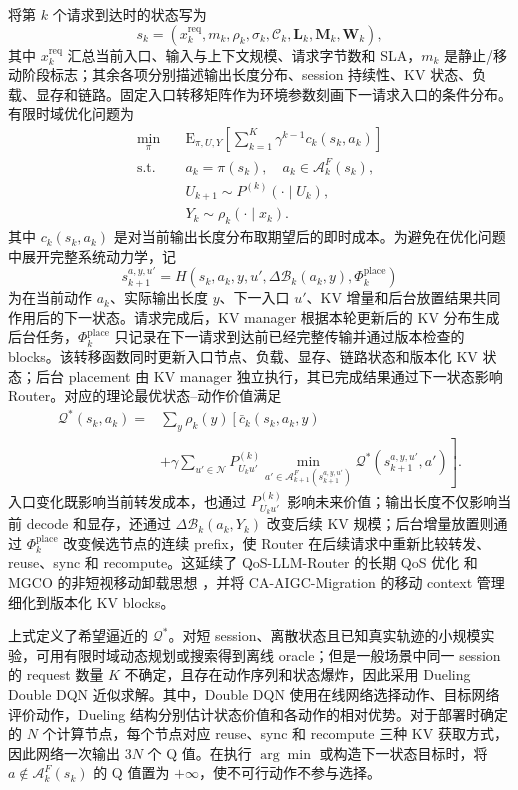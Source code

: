 将第 \(k\) 个请求到达时的状态写为
\[
s_k=
(x_k^{\mathrm{req}},m_k,\rho_k,\sigma_k,\mathcal C_k,
\mathbf L_k,\mathbf M_k,\mathbf W_k),
\]
其中 \(x_k^{\mathrm{req}}\) 汇总当前入口、输入与上下文规模、请求字节数和 SLA，\(m_k\) 是静止/移动阶段标志；其余各项分别描述输出长度分布、session 持续性、KV 状态、负载、显存和链路。固定入口转移矩阵作为环境参数刻画下一请求入口的条件分布。有限时域优化问题为
\[
\begin{array}{ll}
\displaystyle\min_{\pi}\quad&
\displaystyle
\mathrm E_{\pi,U,Y}
\left[\sum_{k=1}^{K}\gamma^{k-1}c_k(s_k,a_k)\right]\\
\mathrm{s.t.}\quad&
a_k=\pi(s_k),\quad a_k\in\mathcal A_k^F(s_k),\\
&U_{k+1}\sim P^{(k)}(\cdot\mid U_k),\\
&Y_k\sim\rho_k(\cdot\mid x_k).
\end{array}
\]
其中 \(c_k(s_k,a_k)\) 是对当前输出长度分布取期望后的即时成本。为避免在优化问题中展开完整系统动力学，记
\[
s_{k+1}^{a,y,u'}
=
H(s_k,a_k,y,u',\Delta\mathcal B_k(a_k,y),
\Phi_k^{\mathrm{place}})
\]
为在当前动作 \(a_k\)、实际输出长度 \(y\)、下一入口 \(u'\)、KV 增量和后台放置结果共同作用后的下一状态。请求完成后，KV manager 根据本轮更新后的 KV 分布生成后台任务，\(\Phi_k^{\mathrm{place}}\) 只记录在下一请求到达前已经完整传输并通过版本检查的 blocks。该转移函数同时更新入口节点、负载、显存、链路状态和版本化 KV 状态；后台 placement 由 KV manager 独立执行，其已完成结果通过下一状态影响 Router。对应的理论最优状态--动作价值满足
\[
\begin{array}{rl}
\mathcal Q^*(s_k,a_k)
={}&\displaystyle
\sum_y\rho_k(y)
\left[
\bar c_k(s_k,a_k,y)\right.\\
&\displaystyle\left.
+\gamma
\sum_{u'\in\mathcal N}
 P_{U_ku'}^{(k)}
\min_{a'\in\mathcal A_{k+1}^F(s_{k+1}^{a,y,u'})}
\mathcal Q^*(s_{k+1}^{a,y,u'},a')
\right].
\end{array}
\]
入口变化既影响当前转发成本，也通过 \(P_{U_ku'}^{(k)}\) 影响未来价值；输出长度不仅影响当前 decode 和显存，还通过 \(\Delta\mathcal B_k(a_k,Y_k)\) 改变后续 KV 规模；后台增量放置则通过 \(\Phi_k^{\mathrm{place}}\) 改变候选节点的连续 prefix，使 Router 在后续请求中重新比较转发、reuse、sync 和 recompute。这延续了 QoS-LLM-Router 的长期 QoS 优化 \cite{yang2025quality} 和 MGCO 的非短视移动卸载思想 \cite{ghosh2025mgco}，并将 CA-AIGC-Migration 的移动 context 管理 \cite{wang2026context} 细化到版本化 KV blocks。

\begin{changehighlight}
上式定义了希望逼近的 \(\mathcal Q^*\)。对短 session、离散状态且已知真实轨迹的小规模实验，可用有限时域动态规划或搜索得到离线 oracle；但是一般场景中同一 session 的 request 数量 \(K\) 不确定，且存在动作序列和状态爆炸，因此采用 Dueling Double DQN 近似求解。其中，Double DQN 使用在线网络选择动作、目标网络评价动作，Dueling 结构分别估计状态价值和各动作的相对优势。对于部署时确定的 \(N\) 个计算节点，每个节点对应 reuse、sync 和 recompute 三种 KV 获取方式，因此网络一次输出 \(3N\) 个 Q 值。在执行 \(\arg\min\) 或构造下一状态目标时，将 \(a\notin\mathcal A_k^F(s_k)\) 的 Q 值置为 \(+\infty\)，使不可行动作不参与选择。
\end{changehighlight}

